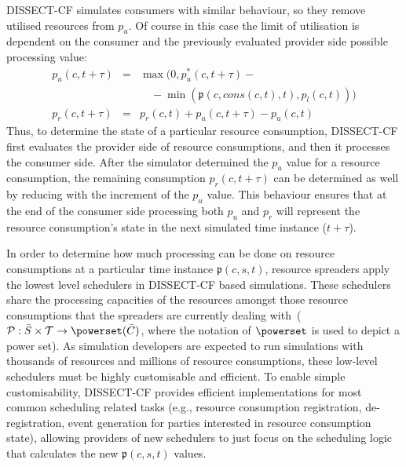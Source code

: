 \documentclass[sort, compress, 5p]{elsarticle}
\newcommand{\SMALLESTIMEGRANULARITYM}{\tau}
\newcommand{\SIMULATIONTIMEM}{\mathcal{T}}
\begin{document}
DISSECT-CF simulates consumers with similar behaviour, so they remove utilised resources from $p_u$. Of course in this case the limit of utilisation is dependent on the consumer and the previously evaluated provider side possible processing value:
\begin{eqnarray}
p_u(c,t+\SMALLESTIMEGRANULARITYM)&=&\max\big(0,p_u^*(c,t+\SMALLESTIMEGRANULARITYM)-\nonumber\\
&&\quad-\min(\mathfrak{p}(c, cons(c,t),t),p_l(c,t))\big)\nonumber\\\label{EQ-CONS-UPDATE}
p_r(c,t+\SMALLESTIMEGRANULARITYM)&=&p_r(c,t)+p_u(c,t+\SMALLESTIMEGRANULARITYM)-p_u(c,t)
\end{eqnarray}
Thus, to determine the state of a particular resource consumption, DISSECT-CF first evaluates the provider side of resource consumptions, and then it processes the consumer side. After the simulator determined the $p_u$ value for a resource consumption, the remaining consumption $p_r(c,t+\SMALLESTIMEGRANULARITYM)$ can be determined as well by reducing with the increment of the $p_u$ value. This behaviour ensures that at the end of the consumer side processing both $p_u$ and $p_r$ will represent the resource consumption's state in the next simulated time instance ($t+\SMALLESTIMEGRANULARITYM$). 

In order to determine how much processing can be done on resource consumptions at a particular time instance $\mathfrak{p}(c,s,t)$, resource spreaders apply the lowest level schedulers in DISSECT-CF based simulations. These schedulers share the processing capacities of the resources amongst those resource consumptions that the spreaders are currently dealing with~($\mathcal{P}: \bar{S} \times \SIMULATIONTIMEM \to \powerset(\bar{C})$, where the notation of $\powerset$ is used to depict a power set). As simulation developers are expected to run simulations with thousands of resources and millions of resource consumptions, these low-level schedulers must be highly customisable and efficient. To enable simple customisability, DISSECT-CF provides efficient implementations for most common scheduling related tasks (e.g., resource consumption registration, de-registration, event generation for parties interested in resource consumption state), allowing providers of new schedulers to just focus on the scheduling logic that calculates the new $\mathfrak{p}(c,s,t)$ values.
\end{document}
